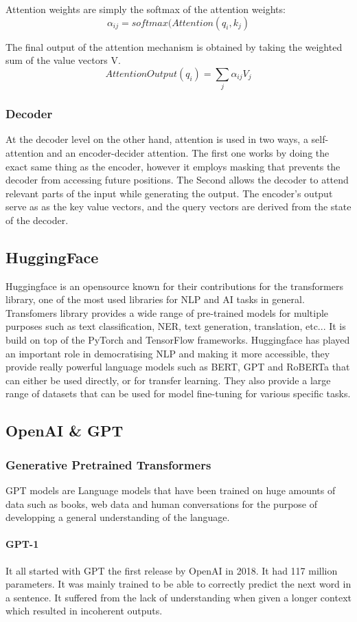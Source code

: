\documentclass[a4paper,12pt,twoside]{report}
\begin{document}
Attention weights are simply the softmax of the attention weights: $$\alpha_{ij} = softmax(Attention(q_{i},k_{j})$$

The final output of the attention mechanism is obtained by taking the weighted sum of the value vectors V.
$$AttentionOutput(q_{i}) = \sum_{j}\alpha_{ij} V_{j} $$
\subsubsection{Decoder}
At the decoder level on the other hand, attention is used in two ways, a self-attention and an encoder-decider attention. The first one works by doing the exact same thing as the encoder, however it employs masking that prevents the decoder from accessing future positions. The Second allows the decoder to attend relevant parts of the input while generating the output. The encoder's output serve as as the key value vectors, and the query vectors are derived from the state of the decoder.

\subsection{HuggingFace}
Huggingface\cite{huggingface} is an opensource known for their contributions for the transformers library, one of the most used libraries for NLP and AI tasks in general. 
Transfomers library provides a wide range of pre-trained models for multiple purposes such as text classification, NER, text generation, translation, etc... It is build on top of the PyTorch and TensorFlow frameworks.
Huggingface has played an important role in democratising NLP and making it more accessible, they provide really powerful language models such as BERT, GPT and RoBERTa that can either be used directly, or for transfer learning. They also provide a large range of datasets that can be used for model fine-tuning for various specific tasks.

\subsection{OpenAI \& GPT}
\subsubsection{Generative Pretrained Transformers}
GPT models are Language models that have been trained on huge amounts of data such as books, web data and human conversations for the purpose of developping a general understanding of the language. 
\paragraph{GPT-1}
It all started with GPT the first release by OpenAI\cite{openai} in 2018. It had 117 million parameters. It was mainly trained to be able to correctly predict the next word in a sentence. It suffered from the lack of understanding when given a longer context which resulted in incoherent outputs.
\end{document}

